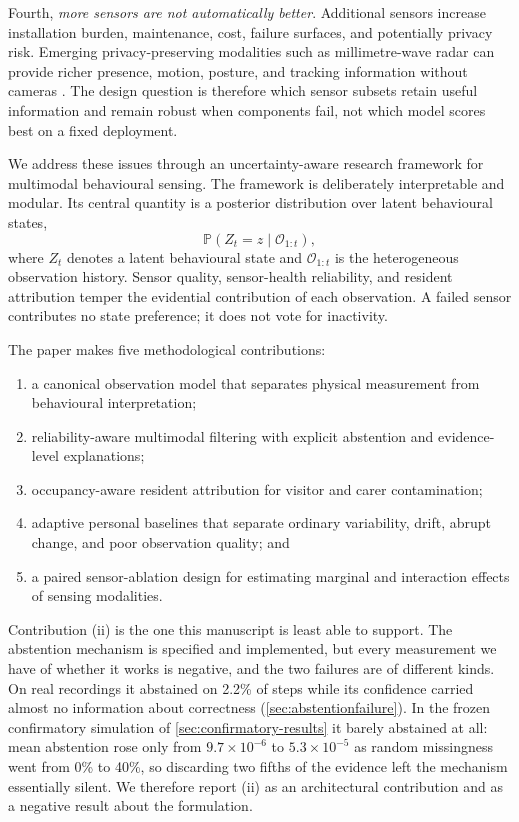 \documentclass[11pt]{article}
\newcommand{\Prob}{\mathbb{P}}
\newcommand{\calO}{\mathcal{O}}
\begin{document}
Fourth, \emph{more sensors are not automatically better}. Additional sensors increase installation burden, maintenance, cost, failure surfaces, and potentially privacy risk. Emerging privacy-preserving modalities such as millimetre-wave radar can provide richer presence, motion, posture, and tracking information without cameras \citep{chen2026mmwave,samimi2026fmcw}. The design question is therefore which sensor subsets retain useful information and remain robust when components fail, not which model scores best on a fixed deployment.

We address these issues through an uncertainty-aware research framework for multimodal behavioural sensing. The framework is deliberately interpretable and modular. Its central quantity is a posterior distribution over latent behavioural states,
\begin{equation}
    \Prob(Z_t=z\mid \calO_{1:t}),
\end{equation}
where $Z_t$ denotes a latent behavioural state and $\calO_{1:t}$ is the heterogeneous observation history. Sensor quality, sensor-health reliability, and resident attribution temper the evidential contribution of each observation. A failed sensor contributes no state preference; it does not vote for inactivity.

The paper makes five methodological contributions:
\begin{enumerate}[label=(\roman*)]
    \item a canonical observation model that separates physical measurement from behavioural interpretation;
    \item reliability-aware multimodal filtering with explicit abstention and evidence-level explanations;
    \item occupancy-aware resident attribution for visitor and carer contamination;
    \item adaptive personal baselines that separate ordinary variability, drift, abrupt change, and poor observation quality; and
    \item a paired sensor-ablation design for estimating marginal and interaction effects of sensing modalities.
\end{enumerate}

Contribution (ii) is the one this manuscript is least able to support. The
abstention mechanism is specified and implemented, but every measurement we have
of whether it works is negative, and the two failures are of different kinds. On
real recordings it abstained on 2.2\% of steps while its confidence carried
almost no information about correctness (\cref{sec:abstentionfailure}). In the
frozen confirmatory simulation of \cref{sec:confirmatory-results} it barely
abstained at all:
mean abstention rose only from $9.7\times10^{-6}$ to $5.3\times10^{-5}$ as
random missingness went from 0\% to 40\%, so discarding two fifths of the
evidence left the mechanism essentially silent. We therefore report (ii) as an
architectural contribution and as a negative result about the formulation.
\end{document}
